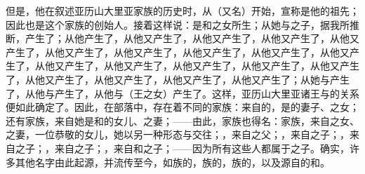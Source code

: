 但是，他在叙述亚历山大里亚家族的历史时，从（又名）开始，宣称是他的祖先；因此也是这个家族的创始人。接着这样说：是和之女所生；从她与之子，据我所推断，产生了；从他产生了，从他又产生了，从他又产生了，从他又产生了，从他又产生了，从他又产生了，从他又产生了，从他又产生了，从他又产生了，从他又产生了，从他又产生了，从他又产生了，从他又产生了，从他又产生了，从他又产生了，从他又产生了，从他又产生了，从他又产生了，从他又产生了；从她与产生了，从他与产生了，从他与（王之女）产生了。这样，亚历山大里亚诸王与的关系便如此确定了。因此，在部落中，存在着不同的家族：来自的，是的妻子、之女；还有家族，来自她是和的女儿、之妻；——由此，家族也得名：家族，来自之女、之妻，一位恭敬的女儿，她以另一种形态与交往；，来自之父；，来自之子；，来自之子；，来自之子；，来自和之子；——因为所有这些人都属于之子。确实，许多其他名字由此起源，并流传至今，如族的，族的，族的，以及源自的和。\par


